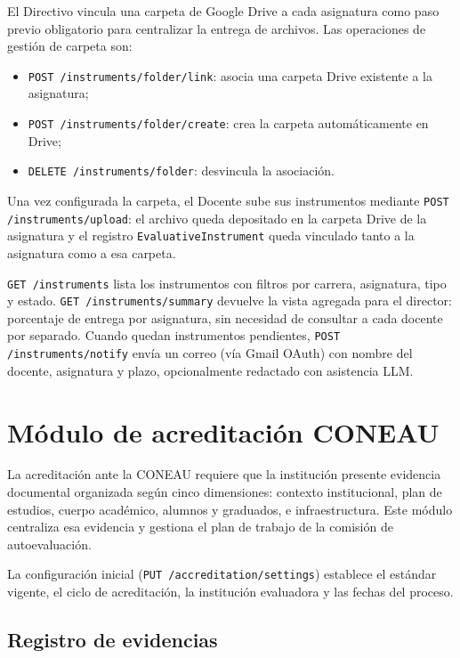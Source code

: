 El Directivo vincula una carpeta de Google Drive a cada asignatura
como paso previo obligatorio para centralizar la entrega de archivos.
Las operaciones de gestión de carpeta son:
\begin{itemize}[noitemsep, topsep=2pt]
  \item \texttt{POST /instruments/folder/link}: asocia una carpeta Drive
    existente a la asignatura;
  \item \texttt{POST /instruments/folder/create}: crea la carpeta
    automáticamente en Drive;
  \item \texttt{DELETE /instruments/folder}: desvincula la asociación.
\end{itemize}
Una vez configurada la carpeta, el Docente sube sus instrumentos mediante
\texttt{POST /instruments/upload}: el archivo queda depositado en la
carpeta Drive de la asignatura y el registro \texttt{EvaluativeInstrument}
queda vinculado tanto a la asignatura como a esa carpeta.

\texttt{GET /instruments} lista los instrumentos con filtros por carrera,
asignatura, tipo y estado.
\texttt{GET /instruments/summary} devuelve la vista agregada para el
director: porcentaje de entrega por asignatura, sin necesidad de consultar
a cada docente por separado.
Cuando quedan instrumentos pendientes, \texttt{POST /instruments/notify}
envía un correo (vía Gmail OAuth) con nombre del docente, asignatura y
plazo, opcionalmente redactado con asistencia LLM.

\section{Módulo de acreditación CONEAU}
\label{sec:acreditacion}

La acreditación ante la CONEAU requiere que la institución presente
evidencia documental organizada según cinco dimensiones: contexto
institucional, plan de estudios, cuerpo académico, alumnos y graduados,
e infraestructura.   Este módulo centraliza esa evidencia y gestiona
el plan de trabajo de la comisión de autoevaluación.

La configuración inicial (\texttt{PUT /accreditation/settings}) establece
el estándar vigente, el ciclo de acreditación, la institución evaluadora
y las fechas del proceso.

\subsection{Registro de evidencias}
\label{subsec:evidencias}

